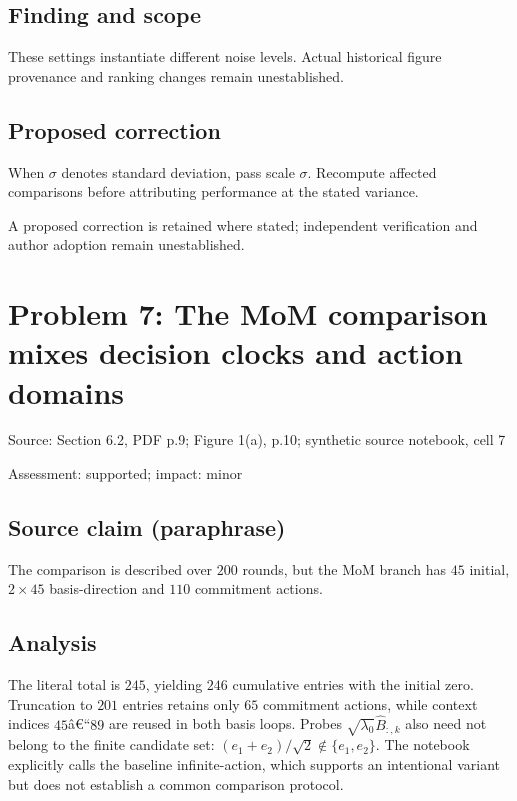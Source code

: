 \documentclass[11pt]{article}
\begin{document}
\subsection*{Finding and scope}

These settings instantiate different noise levels. Actual historical figure provenance and ranking changes remain unestablished.

\subsection*{Proposed correction}

When \(\sigma\) denotes standard deviation, pass scale \(\sigma\). Recompute affected comparisons before attributing performance at the stated variance.

A proposed correction is retained where stated; independent verification and author adoption remain unestablished.

\section*{Problem 7: The MoM comparison mixes decision clocks and action domains}

Source: Section 6.2, PDF p.9; Figure 1(a), p.10; synthetic source notebook, cell 7

Assessment: supported; impact: minor

\subsection*{Source claim (paraphrase)}

The comparison is described over \(200\) rounds, but the MoM branch has \(45\) initial, \(2\times45\) basis-direction and \(110\) commitment actions.

\subsection*{Analysis}

The literal total is \(245\), yielding \(246\) cumulative entries with the initial zero. Truncation to \(201\) entries retains only \(65\) commitment actions, while context indices \(45\)â€“\(89\) are reused in both basis loops. Probes \(\sqrt{\lambda_0}\widehat B_{:,k}\) also need not belong to the finite candidate set: \((e_1+e_2)/\sqrt2\notin\{e_1,e_2\}\). The notebook explicitly calls the baseline infinite-action, which supports an intentional variant but does not establish a common comparison protocol.
\end{document}
